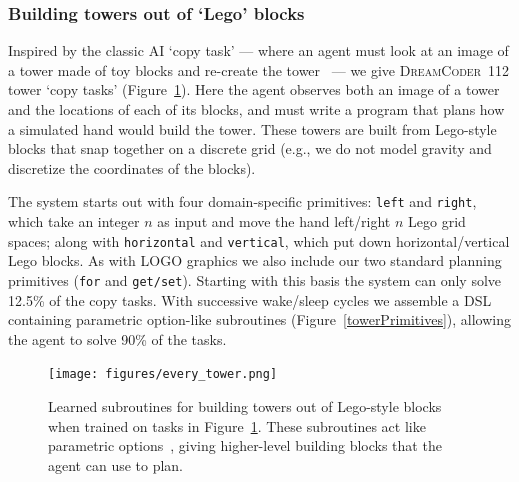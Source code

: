 \documentclass{article}
\newcommand{\system}{\textsc{DreamCoder}~}
\newcommand{\code}[1]{{\footnotesize\texttt{#1}}}
\begin{document}
\subsubsection{Building towers out of `Lego' blocks}\label{towerSection}

Inspired by the classic AI `copy task' --- where an agent must look at
an image of a tower made of toy blocks and re-create the
tower~\cite{towerCopy} --- we give \system 112 tower `copy tasks'
(Figure~\ref{towerTasks}).  Here the agent observes both an image of a
tower and the locations of each of its blocks, and must write a
program that plans how a simulated hand would build the tower.
These towers are built from Lego-style blocks
that snap together on a discrete grid (e.g., we do not model gravity
and discretize the coordinates of the blocks).

The system starts out with four domain-specific primitives:
\code{left} and \code{right}, which take an integer $n$ as input and
move the hand left/right $n$ Lego grid spaces; along with
\code{horizontal} and \code{vertical}, which put down
horizontal/vertical Lego blocks.  As with LOGO graphics we also
include our two standard planning primitives (\code{for} and
\code{get/set}).
Starting with this basis
the system can only solve
12.5\% of the copy tasks.
With successive wake/sleep cycles
we assemble a DSL containing
parametric option-like subroutines (Figure~\ref{towerPrimitives}),
allowing the agent to solve 90\% of the tasks.
\begin{figure}
  \texttt{[image: figures/every\_tower.png]}
  \caption{}\label{towerTasks}
\end{figure}
\begin{figure}
  \caption{Learned subroutines for building towers out of Lego-style blocks when trained on tasks in Figure~\ref{towerTasks}. These subroutines act like parametric options~\cite{options},
  giving higher-level building blocks that the agent can use to plan.}
  \end{figure}
\end{document}

